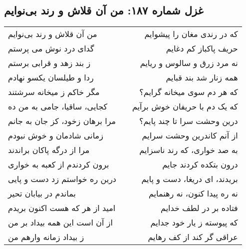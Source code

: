 \begin{center}
\section*{غزل شماره ۱۸۷: من آن قلاش و رند بی‌نوایم}
\label{sec:187}
\begin{longtable}{l p{0.5cm} r}
من آن قلاش و رند بی‌نوایم
&&
که در رندی مغان را پیشوایم
\\
گدای درد نوش می پرستم
&&
حریف پاکباز کم دغایم
\\
ز بند زهد و قرابی برستم
&&
نه مرد زرق و سالوس و ریایم
\\
ردا و طیلسان یکسو نهادم
&&
همه زنار شد بند قبایم
\\
مگر خاکم ز میخانه سرشتند
&&
که هر دم سوی میخانه گرایم؟
\\
کجایی، ساقیا، جامی به من ده
&&
که یک دم با حریفان خوش برآیم
\\
مرا برهان زخود، کز جان به جانم
&&
درین وحشت سرا تا چند پایم؟
\\
زمانی شادمان و خوش نبودم
&&
از آنم کاندرین وحشت سرایم
\\
مرا از درگه پاکان براندند
&&
به صد خواری، که رند ناسزایم
\\
برون کردندم از کعبه به خواری
&&
درون بتکده کردند جایم
\\
درین ره خواستم زد دست و پایی
&&
بریدند، ای دریغا، دست و پایم
\\
بماندم در بیابان تحیر
&&
نه ره پیدا کنون، نه رهنمایم
\\
امید از هر که هست اکنون بریدم
&&
فتاده بر در لطف خدایم
\\
از آن است این همه بیداد بر من
&&
که پیوسته ز یار خود جدایم
\\
ز بیداد زمانه وارهم من
&&
عراقی گر کند از کف رهایم
\\
\end{longtable}
\end{center}
